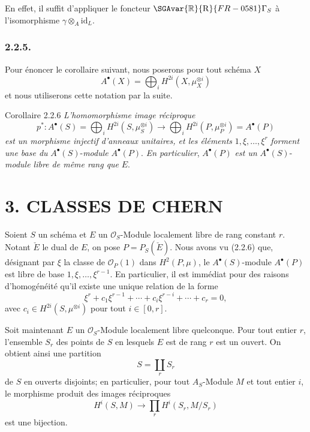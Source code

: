 En effet, il suffit d'appliquer le foncteur $\SGAvar{\mathbb{R}}{\mathrm{R}}{FR-0581}\Gamma_S$ à l'isomorphisme $\gamma\otimes_A\mathrm{id}_L$.

\subsubsection*{2.2.5.}
Pour énoncer le corollaire suivant, nous poserons pour tout schéma $X$
\[
A^\bullet(X)=\bigoplus_i H^{2i}(X,\mu_X^{\otimes i})
\]
et nous utiliserons  cette notation par la suite.

\begin{statement}{Corollaire 2.2.6}
\emph{L'homomorphisme image réciproque}
\[
p^*:A^\bullet(S)=\bigoplus_i H^{2i}(S,\mu_S^{\otimes i})
\longrightarrow
\bigoplus_i H^{2i}(P,\mu_P^{\otimes i})=A^\bullet(P)
\]
\emph{est un morphisme injectif d'anneaux unitaires, et les éléments} $1,\xi,\ldots,\xi^r$ \emph{forment une base du} $A^\bullet(S)$-\emph{module} $A^\bullet(P)$. \emph{En particulier}, $A^\bullet(P)$ \emph{est un} $A^\bullet(S)$-\emph{module libre de même rang que} $E$.
\end{statement}

\section*{3. CLASSES DE CHERN}

Soient $S$ un schéma et $E$ un $\mathcal{O}_S$-Module localement libre de rang constant $r$. Notant $\check E$ le dual de $E$, on pose $P=P_S(\check E)$. Nous avons vu (2.2.6) que, désignant par $\xi$ la classe de $\mathcal{O}_P(1)$ dans $H^2(P,\mu)$, le $A^\bullet(S)$-module $A^\bullet(P)$ est libre de base $1,\xi,\ldots,\xi^{r-1}$. En particulier, il est immédiat pour des raisons d'homogénéité qu'il existe une unique relation de la forme
\[
\xi^r+c_1\xi^{r-1}+\cdots+c_i\xi^{r-i}+\cdots+c_r=0,
\tag*{3.1.}
\]
avec $c_i\in H^{2i}(S,\mu^{\otimes i})$ pour tout $i\in[0,r]$.

Soit maintenant $E$ un $\mathcal{O}_S$-Module localement libre quelconque. Pour tout entier $r$, l'ensemble $S_r$ des points de $S$ en lesquels $E$ est de rang $r$ est un ouvert. On obtient ainsi une partition
\[
S=\coprod_r S_r
\]
de $S$ en ouverts disjoints; en particulier, pour tout $A_S$-Module $M$ et tout entier $i$, le morphisme produit des images réciproques
\[
H^i(S,M)\longrightarrow \prod_r H^i(S_r,M/S_r)
\]
est une bijection.

